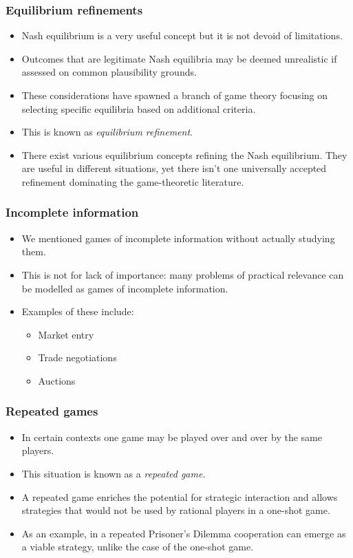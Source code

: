 \documentclass[10pt]{beamer}
\theoremstyle{definition}
\begin{document}
\begin{frame}[fragile]
\frametitle{Equilibrium refinements}
\begin{itemize}\itemsep1em
\item Nash equilibrium is a very useful concept but it is not devoid of limitations.
\item Outcomes that are legitimate Nash equilibria may be deemed unrealistic if assessed on common plausibility grounds.
\item These considerations have spawned a branch of game theory focusing on selecting specific equilibria based on additional criteria.
\item This is known as \emph{equilibrium refinement}.
\item There exist various equilibrium concepts refining the Nash equilibrium. They are useful in different situations, yet there isn't one universally accepted refinement dominating the game-theoretic literature.
\end{itemize}
\end{frame}

\begin{frame}[fragile]
\frametitle{Incomplete information}
\begin{itemize}\itemsep1em
\item We mentioned games of incomplete information without actually studying them.
\item This is not for lack of importance: many problems of practical relevance can be modelled as games of incomplete information.
\item Examples of these include:
	\begin{itemize}\itemsep1em
	\item Market entry
	\item Trade negotiations
	\item Auctions
	\end{itemize}
\end{itemize}
\end{frame}


\begin{frame}[fragile]
\frametitle{Repeated games}
\begin{itemize}\itemsep1em
\item In certain contexts one game may be played over and over by the same players.
\item This situation is known as a \emph{repeated game}.
\item A repeated game enriches the potential for strategic interaction and allows strategies that would not be used by rational players in a one-shot game.
\item As an example, in a repeated Prisoner's Dilemma cooperation can emerge as a viable strategy, unlike the case of the one-shot game.
\end{itemize}
\end{frame}
\end{document}
